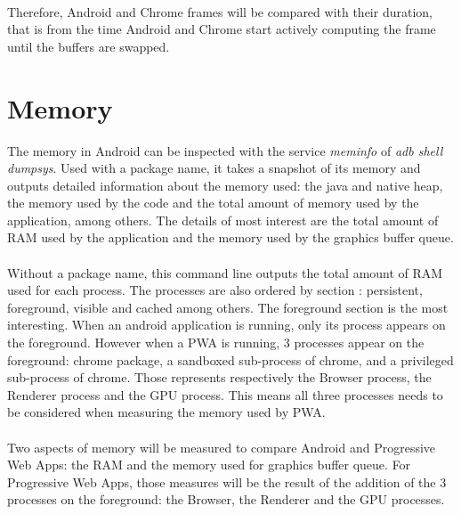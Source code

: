 \documentclass{kththesis}
\begin{document}
\paragraph{}
Therefore, Android and Chrome frames will be compared with their duration, that is from the time Android and Chrome start actively computing the frame until the buffers are swapped. 


\section{Memory}

The memory in Android can be inspected with the service \textit{meminfo} of \textit{adb shell dumpsys}. Used with a package name, it takes a snapshot of its memory and outputs detailed information about the memory used: the java and native heap, the memory used by the code and the total amount of memory used by the application, among others. The details of most interest are the total amount of RAM used by the application and the memory used by the graphics buffer queue.

\paragraph{}
Without a package name, this command line outputs the total amount of RAM used for each process. The processes are also ordered by section : persistent, foreground, visible and cached among others. \newline
The foreground section is the most interesting. When an android application is running, only its process appears on the foreground. However when a PWA is running, 3 processes appear on the foreground: chrome package, a sandboxed sub-process of chrome, and a privileged sub-process of chrome. Those represents respectively the Browser process, the Renderer process and the GPU process. This means all three processes needs to be considered when measuring the memory used by PWA. 

\paragraph{}
Two aspects of memory will be measured to compare Android and Progressive Web Apps: the RAM and the memory used for graphics buffer queue. For Progressive Web Apps, those measures will be the result of the addition of the 3 processes on the foreground: the Browser, the Renderer and the GPU processes.
    
\end{document}
